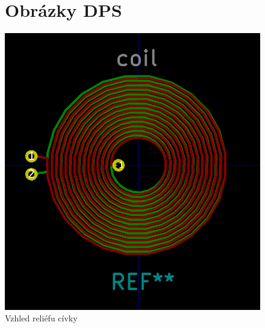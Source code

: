 \begin{figure}
\section{Obrázky DPS}
    \centering
    \includegraphics[width=\textwidth]{kapitoly/obrazky/E4/elektronika_tlakove_desky/civka.png}
    \caption{Vzhled reliéfu cívky}
    \label{fig:E4-relief_civka}
\end{figure}

